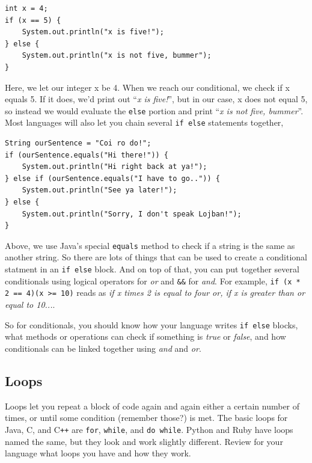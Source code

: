 \documentclass[a4paper]{article}
\begin{document}
\begin{lstlisting}
int x = 4;
if (x == 5) {
    System.out.println("x is five!");
} else {
    System.out.println("x is not five, bummer");
}
\end{lstlisting}

Here, we let our integer x be 4. When we reach our conditional, we check if x equals 5. If it does, we'd print out ``\textit{x is five!}'', but in our case, x does not equal 5, so instead we would evaluate the \texttt{else} portion and print ``\textit{x is not five, bummer}''. Most languages will also let you chain several \texttt{if else} statements together,

\begin{lstlisting}
String ourSentence = "Coi ro do!";
if (ourSentence.equals("Hi there!")) {
    System.out.println("Hi right back at ya!");
} else if (ourSentence.equals("I have to go..")) {
    System.out.println("See ya later!");
} else {
    System.out.println("Sorry, I don't speak Lojban!");
}
\end{lstlisting}

Above, we use Java's special \texttt{equals} method to check if a string is the same as another string. So there are lots of things that can be used to create a conditional statment in an \texttt{if else} block. And on top of that, you can put together several conditionals using logical operators \texttt{\textbar\textbar} for \textit{or} and \texttt{\&\&} for \textit{and}. For example, \texttt{if (x * 2 == 4)\textbar\textbar (x >= 10)} reads as \textit{if x times 2 is equal to four or, if x is greater than or equal to 10...}. 

So for conditionals, you should know how your language writes \texttt{if else} blocks, what methods or operations can check if something is \textit{true} or \textit{false}, and how conditionals can be linked together using \textit{and} and \textit{or}.

\subsection{Loops}
Loops let you repeat a block of code again and again either a certain number of times, or until some condition (remember those?) is met. The basic loops for Java, C, and C\texttt{++} are \texttt{for}, \texttt{while}, and \texttt{do while}. Python and Ruby have loops named the same, but they look and work slightly different. Review for your language what loops you have and how they work.
\end{document}
